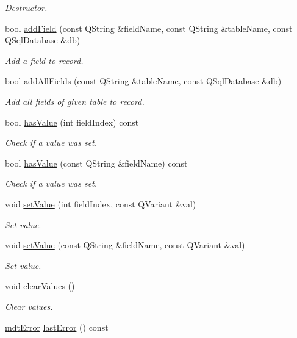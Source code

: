 \begin{DoxyCompactItemize}
\begin{DoxyCompactList}\small\item\em Destructor. \end{DoxyCompactList}\item 
bool \hyperlink{classmdt_sql_record_a7b144e9c00e46748e1729251aabd5f51}{addField} (const QString \&fieldName, const QString \&tableName, const QSqlDatabase \&db)
\begin{DoxyCompactList}\small\item\em Add a field to record. \end{DoxyCompactList}\item 
bool \hyperlink{classmdt_sql_record_a878c551b98df2653d642ec01b0101495}{addAllFields} (const QString \&tableName, const QSqlDatabase \&db)
\begin{DoxyCompactList}\small\item\em Add all fields of given table to record. \end{DoxyCompactList}\item 
bool \hyperlink{classmdt_sql_record_aa0ccfa8ae2bd37d33dbecf8d2bb2cd01}{hasValue} (int fieldIndex) const 
\begin{DoxyCompactList}\small\item\em Check if a value was set. \end{DoxyCompactList}\item 
bool \hyperlink{classmdt_sql_record_a581595f4425f824c794994eb564873cd}{hasValue} (const QString \&fieldName) const 
\begin{DoxyCompactList}\small\item\em Check if a value was set. \end{DoxyCompactList}\item 
void \hyperlink{classmdt_sql_record_a330291ff82fb8c7803c47d30f8939ed5}{setValue} (int fieldIndex, const QVariant \&val)
\begin{DoxyCompactList}\small\item\em Set value. \end{DoxyCompactList}\item 
void \hyperlink{classmdt_sql_record_a8bcaf65b449b6c82548735cdccb8cff1}{setValue} (const QString \&fieldName, const QVariant \&val)
\begin{DoxyCompactList}\small\item\em Set value. \end{DoxyCompactList}\item 
void \hyperlink{classmdt_sql_record_a0bfc0fc265c6b0048698e2f5d4f840a8}{clearValues} ()
\begin{DoxyCompactList}\small\item\em Clear values. \end{DoxyCompactList}\item 
\hypertarget{classmdt_sql_record_aa997bbc32402c3a254404ab74b9662f0}{
\hyperlink{classmdt_error}{mdtError} \hyperlink{classmdt_sql_record_aa997bbc32402c3a254404ab74b9662f0}{lastError} () const }
\label{classmdt_sql_record_aa997bbc32402c3a254404ab74b9662f0}


\end{DoxyCompactItemize}
